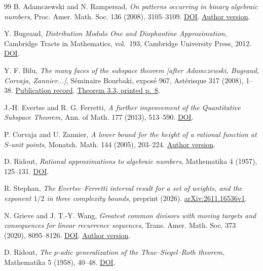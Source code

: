 \documentclass[11pt,reqno,a4paper]{amsart}
\theoremstyle{remark}
\begin{document}
\begin{thebibliography}{99}
B. Adamczewski and N. Rampersad,
\emph{On patterns occurring in binary algebraic numbers},
Proc. Amer. Math. Soc. 136 (2008), 3105--3109.
\href{https://doi.org/10.1090/S0002-9939-08-09319-2}{DOI}.
\href{https://adamczewski.perso.math.cnrs.fr/Overlap.pdf}{Author version}.

Y. Bugeaud,
\emph{Distribution Modulo One and Diophantine Approximation},
Cambridge Tracts in Mathematics, vol.~193, Cambridge University Press,
2012.
\href{https://doi.org/10.1017/CBO9781139017732}{DOI}.

Y. F. Bilu, \emph{The many faces of the subspace theorem [after
Adamczewski, Bugeaud, Corvaja, Zannier...]}, S\'eminaire Bourbaki,
expos\'e 967, Ast\'erisque 317 (2008), 1--38.
\href{https://www.numdam.org/book-part/AST_2008__317__1_0/}{Publication record}.
\href{https://arxiv.org/pdf/0907.2098#page=8}{Theorem 3.3, printed p.~8}.

J.-H. Evertse and R. G. Ferretti, \emph{A further improvement of the Quantitative Subspace Theorem}, Ann. of Math. 177 (2013), 513--590. \href{https://doi.org/10.4007/annals.2013.177.2.4}{DOI}.

P. Corvaja and U. Zannier,
\emph{A lower bound for the height of a rational function at $S$-unit points},
Monatsh. Math. 144 (2005), 203--224.
\href{https://arxiv.org/abs/math/0311030}{Author version}.

D. Ridout,
\emph{Rational approximations to algebraic numbers},
Mathematika 4 (1957), 125--131.
\href{https://doi.org/10.1112/S0025579300001182}{DOI}.

R. Stephan,
\emph{The Evertse--Ferretti interval result for a set of weights, and the exponent $1/2$ in three complexity bounds},
preprint (2026).
\href{https://arxiv.org/abs/2611.16536v1}{arXiv:2611.16536v1}.

N. Grieve and J. T.-Y. Wang,
\emph{Greatest common divisors with moving targets and consequences
for linear recurrence sequences},
Trans. Amer. Math. Soc. 373 (2020), 8095--8126.
\href{https://doi.org/10.1090/tran/8220}{DOI}.
\href{https://arxiv.org/abs/1902.09109}{Author version}.

D. Ridout,
\emph{The \(p\)-adic generalization of the Thue--Siegel--Roth theorem},
Mathematika 5 (1958), 40--48.
\href{https://doi.org/10.1112/S0025579300001339}{DOI}.


\end{thebibliography}
\end{document}
